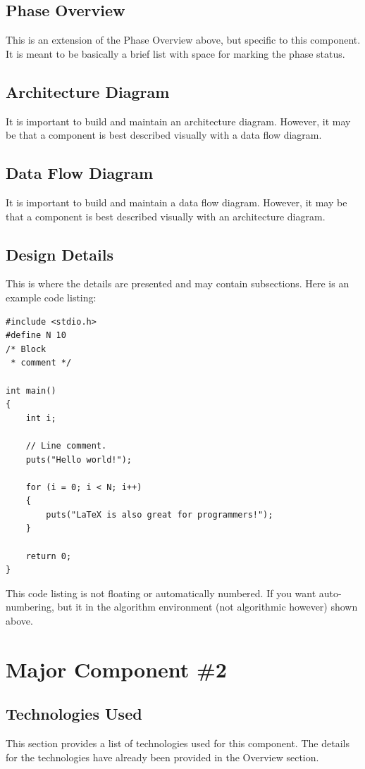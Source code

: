 \subsection{Phase Overview}
This is an extension of the Phase Overview above, but specific to this component. 
 It is meant to be basically a brief list with space for marking the phase status. 

\subsection{ Architecture  Diagram}
It is important to build and maintain an architecture diagram.  However, it may 
be that a component is best described visually with a data flow diagram. 


\subsection{Data Flow Diagram}
It is important to build and maintain a data flow diagram.  However, it may be 
that a component is best described visually with an architecture diagram. 


\subsection{Design Details}
This is where the details are presented and may contain subsections.   Here is an example code listing:
\begin{lstlisting}
#include <stdio.h>
#define N 10
/* Block
 * comment */
 
int main()
{
    int i;
 
    // Line comment.
    puts("Hello world!");
 
    for (i = 0; i < N; i++)
    {
        puts("LaTeX is also great for programmers!");
    }
 
    return 0;
}
\end{lstlisting}
This code listing is not floating or automatically numbered.  If you want auto-numbering, but it in the algorithm environment (not algorithmic however) shown above.



\section{Major Component \#2 }

\subsection{Technologies  Used}
This section provides a list of technologies used for this component.  The details 
for the technologies have already been provided in the Overview section. 

